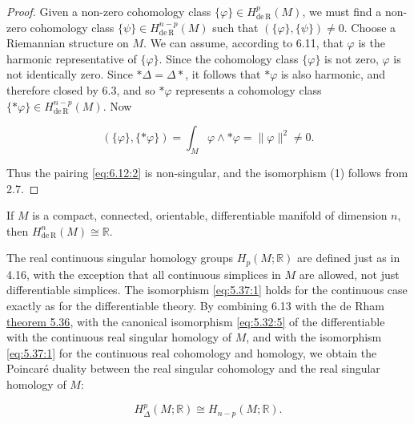 \begin{proof}
Given a non-zero cohomology class $\{\varphi\} \in H_{\mathrm{de\,R}}^{p}(M)$, we must find a non-zero cohomology class $\{\psi\} \in H_{\mathrm{de\,R}}^{n-p}(M)$ such that $\left(\{\varphi\},\{\psi\}\right) \neq 0$. Choose a Riemannian structure on $M$. We can assume, according to 6.11, that $\varphi$ is the harmonic representative of $\{\varphi\}$. Since the cohomology class $\{\varphi\}$ is not zero, $\varphi$ is not identically zero. Since $\ast\Delta=\Delta\ast$, it follows that $* \varphi$ is also harmonic, and therefore closed by 6.3, and so $* \varphi$ represents a cohomology class $\{*\varphi\} \in H_{\mathrm{de\,R}}^{n-p}(M)$. Now

\begin{equation}
\tag{2}\label{eq:6.13:2}
\left(\{\varphi\},\{\ast\varphi\}\right)=\int_{M}\varphi\wedge\ast\varphi=\|\varphi\|^{2}\neq0.
\end{equation}

Thus the pairing \eqref{eq:6.12:2} is non-singular, and the isomorphism (1) follows from 2.7.

\end{proof}

\begin{corollary*}
If $M$ is a compact, connected, orientable, differentiable manifold of dimension $n$, then $H_{\mathrm{de\,R}}^{n}(M) \cong \mathbb{R}$.
\end{corollary*}

\begin{remarks}\label{thm:6.14}
The real continuous singular homology groups $H_{p}(M;\mathbb{R})$ are defined just as in 4.16, with the exception that all continuous simplices in $M$ are allowed, not just differentiable simplices. The isomorphism \eqref{eq:5.37:1} holds for the continuous case exactly as for the differentiable theory. By combining 6.13 with the de Rham \hyperref[thm:5.36]{theorem 5.36}, with the canonical isomorphism \eqref{eq:5.32:5} of the differentiable with the continuous real singular homology of $M$, and with the isomorphism \eqref{eq:5.37:1} for the continuous real cohomology and homology, we obtain the Poincaré duality between the real singular cohomology and the real singular homology of $M$: 

\begin{equation}
\tag{1}\label{eq:6.14:1}
H_{\Delta}^{p}(M;\mathbb{R})\cong H_{n-p}(M;\mathbb{R}).
\end{equation}

\end{remarks}

